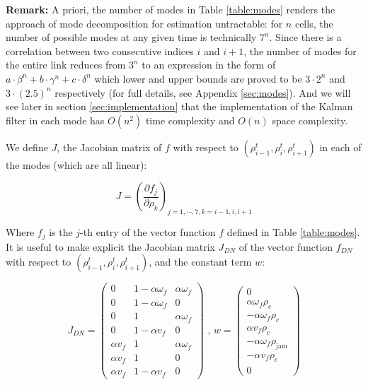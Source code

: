\hspace{10mm}

\noindent \textbf{Remark:} A priori, the number of modes in Table \ref{table:modes} renders the approach of mode decomposition for estimation untractable: for $n$ cells, the number of possible modes at any given time is technically $7^{n}$. Since there is a correlation between two consecutive indices $i$ and $i+1$, the number of modes for the entire link reduces from $3^{n}$ to an expression in the form of $a\cdot\beta^{n} + b\cdot\gamma^{n} + c\cdot\delta^{n}$ which lower and upper bounds are proved to be $3\cdot 2^{n}$ and $3\cdot (2.5)^{n}$ respectively (for full details, see Appendix \ref{sec:modes}). And we will see later in section \ref{sec:implementation} that the implementation of the Kalman filter in each mode has $O(n^{2})$ time complexity and $O(n)$ space complexity.

\hspace{10mm}

We define $J$, the Jacobian matrix of $f$ with respect to $(\rho^{t}_{i-1},\rho^{t}_{i},\rho^{t}_{i+1})$ in each of the modes (which are all linear):

\begin{equation}\label{eq:jacobian}
J = \left(\frac{\partial f_{j}}{\partial \rho_{k}}\right)_{j=1,\cdots,7,k=i-1,i,i+1}
\end{equation}

\noindent Where $f_{j}$ is the $j$-th entry of the vector function $f$ defined in Table \ref{table:modes}. It is useful to make explicit the Jacobian matrix $J_{DN}$ of the vector function $f_{DN}$ with respect to $(\rho^{t}_{i-1},\rho^{t}_{i},\rho^{t}_{i+1})$, and the constant term $w$:

\begin{equation} \label{eq:jacobianDN}
J_{DN} = \left( \begin{array}{ccc}
0 & 1 - \alpha \omega_{f} & \alpha \omega_{f} \\
0 & 1 - \alpha \omega_{f} & 0 \\
0 & 1 & \alpha \omega_{f} \\
0 &  1 - \alpha v_{f} & 0 \\
\alpha v_{f} & 1 & \alpha \omega_{f} \\
\alpha v_{f} & 1 & 0 \\
\alpha v_{f} & 1 - \alpha v_{f} & 0
\end{array} \right)
\text{ ,   }
w = \left( \begin{array}{c}
0 \\
\alpha \omega_{f} \rho_{c}\\
-\alpha \omega_{f} \rho_{c}\\
\alpha v_{f} \rho_{c}\\
-\alpha \omega_{f} \rho_{\text{jam}}\\
-\alpha v_{f} \rho_{c}\\
0
\end{array} \right)
\end{equation}

